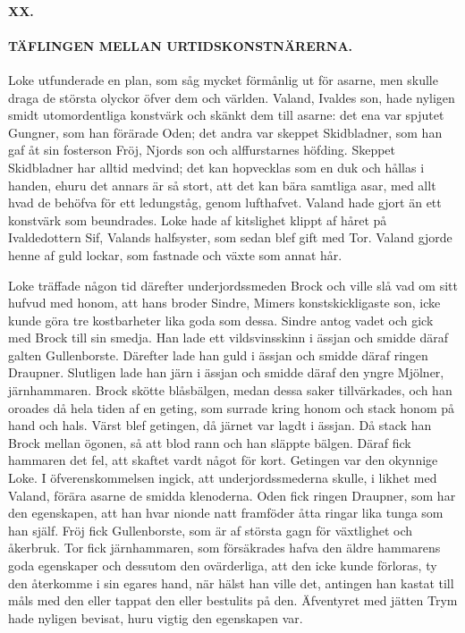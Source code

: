 \paragraph{XX.}

\paragraph{TÄFLINGEN MELLAN URTIDSKONSTNÄRERNA.}

Loke utfunderade en plan, som såg mycket förmånlig ut för asarne, men
skulle draga de största olyckor öfver dem och världen. Valand, Ivaldes
son, hade nyligen smidt utomordentliga konstvärk och skänkt dem till
asarne: det ena var spjutet Gungner, som han förärade Oden; det andra
var skeppet Skidbladner, som han gaf åt sin fosterson Fröj, Njords son
och alffurstarnes höfding. Skeppet Skidbladner har alltid medvind; det
kan hopvecklas som en duk och hållas i handen, ehuru det annars är så
stort, att det kan bära samtliga asar, med allt hvad de behöfva för ett
ledungståg, genom lufthafvet. Valand hade gjort än ett konstvärk som
beundrades. Loke hade af kitslighet klippt af håret på Ivaldedottern
Sif, Valands halfsyster, som sedan blef gift med Tor. Valand gjorde
henne af guld lockar, som fastnade och växte som annat hår.

Loke träffade någon tid därefter underjordssmeden Brock och ville slå
vad om sitt hufvud med honom, att hans broder Sindre, Mimers
konstskickligaste son, icke kunde göra tre kostbarheter lika goda som
dessa. Sindre antog vadet och gick med Brock till sin smedja. Han lade
ett vildsvinsskinn i ässjan och smidde däraf galten Gullenborste.
Därefter lade han guld i ässjan och smidde däraf ringen Draupner.
Slutligen lade han järn i ässjan och smidde däraf den yngre Mjölner,
järnhammaren. Brock skötte blåsbälgen, medan dessa saker tillvärkades,
och han oroades då hela tiden af en geting, som surrade kring honom och
stack honom
\protect\hypertarget{lb1625905.xhtmlux5cux23start62}{}{}\protect\hypertarget{lb1625905.xhtmlux5cux23start62-a}{}{}\protect\hypertarget{lb1625905.xhtmlux5cux23start62-b}{}{}\protect\hypertarget{lb1625905.xhtmlux5cux23start62-c}{}{}\protect\hypertarget{lb1625905.xhtmlux5cux23start62-d}{}{}
på hand och hals. Värst blef getingen, då järnet var lagdt i ässjan. Då
stack han Brock mellan ögonen, så att blod rann och han släppte bälgen.
Däraf fick hammaren det fel, att skaftet vardt något för kort. Getingen
var den okynnige Loke. I öfverenskommelsen ingick, att
underjordssmederna skulle, i likhet med Valand, förära asarne de smidda
klenoderna. Oden fick ringen Draupner, som har den egenskapen, att han
hvar nionde natt framföder åtta ringar lika tunga som han själf. Fröj
fick Gullenborste, som är af största gagn för växtlighet och åkerbruk.
Tor fick järnhammaren, som försäkrades hafva den äldre hammarens goda
egenskaper och dessutom den ovärderliga, att den icke kunde förloras, ty
den återkomme i sin egares hand, när hälst han ville det, antingen han
kastat till måls med den eller tappat den eller bestulits på den.
Äfventyret med jätten Trym hade nyligen bevisat, huru vigtig den
egenskapen var.

